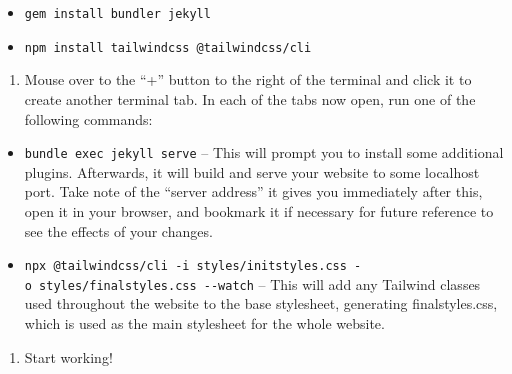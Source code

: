 \documentclass[
]{book}
\providecommand{\tightlist}{%
  \setlength{\itemsep}{0pt}\setlength{\parskip}{0pt}}
\begin{document}
\begin{itemize}
\tightlist
\item
  \texttt{gem\ install\ bundler\ jekyll}
\item
  \texttt{npm\ install\ tailwindcss\ @tailwindcss/cli}
\end{itemize}

\begin{enumerate}
\def\labelenumi{\arabic{enumi}.}
\setcounter{enumi}{7}
\tightlist
\item
  Mouse over to the ``+'' button to the right of the terminal and click it to create another terminal tab. In each of the tabs now open, run one of the following commands:
\end{enumerate}

\begin{itemize}
\tightlist
\item
  \texttt{bundle\ exec\ jekyll\ serve} -- This will prompt you to install some additional plugins. Afterwards, it will build and serve your website to some localhost port. Take note of the ``server address'' it gives you immediately after this, open it in your browser, and bookmark it if necessary for future reference to see the effects of your changes.
\item
  \texttt{npx\ @tailwindcss/cli\ -i\ styles/initstyles.css\ -o\ styles/finalstyles.css\ -\/-watch} -- This will add any Tailwind classes used throughout the website to the base stylesheet, generating finalstyles.css, which is used as the main stylesheet for the whole website.
\end{itemize}

\begin{enumerate}
\def\labelenumi{\arabic{enumi}.}
\setcounter{enumi}{8}
\tightlist
\item
  Start working!
\end{enumerate}


\end{document}
